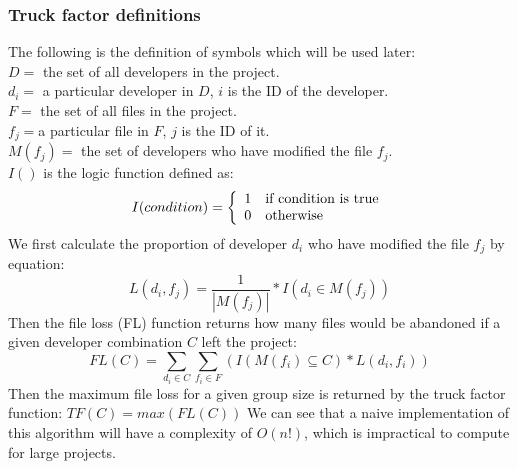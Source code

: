 \documentclass[12pt, a4paper, openright]{report}
\begin{document}
\subsubsection{Truck factor definitions}
The following is the definition of symbols which will be used later:\\
$D =$ the set of all developers in the project.\\ %
$d_{i}=$ a particular developer in $D$, $i$ is the ID of the developer.\\
$F=$ the set of all files in the project.\\ %
$f_{j}=$a particular file in $F$, $j$ is the ID of it.\\
$M(f_{j})=$ the set of developers who have modified the file $f_{j}$.\\
$I()$ is the logic function defined as:
\[ I(condition) = \left\{
\begin{array}{l l}
1 & \textmd{if condition is true}\\
0 & \textmd{otherwise}
\end{array} \right.\]
We first calculate the proportion of developer $d_{i}$ who have modified the file $f_{j}$ by equation:
\begin{equation}L(d_{i},f_{j})=\frac{1}{|M(f_{j})|} * I(d_{i} \in M(f_{j} )) \end{equation}
Then the file loss (FL) function returns how many files would be abandoned if a given developer combination $C$ left the project:
\begin{equation}
FL(C) = \sum_{d_i \in C} \sum_{f_i \in F} (I(M(f_i) \subseteq C)* L(d_i,f_i))
\end{equation}
Then the maximum file loss for a given group size is returned by the truck factor function:
$TF(C) = max(FL(C))$
We can see that a naive implementation of this algorithm will have a complexity of $O(n!)$, which is impractical to compute for large projects.
\end{document}
